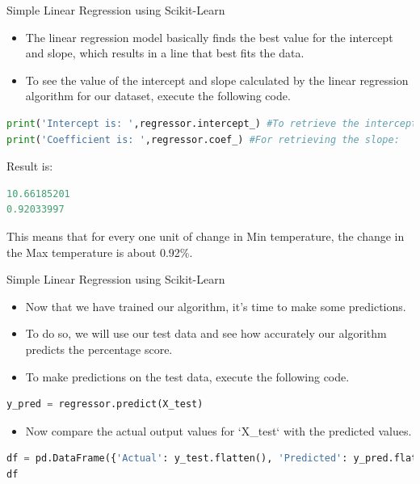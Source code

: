 \documentclass[12pt,xcolor={dvipsnames}]{beamer}
\begin{document}
\begin{frame}[fragile,shrink=12]{Simple Linear Regression using Scikit-Learn}
\begin{itemize}
\item The linear regression model basically finds the best value for the intercept and slope, which results in a line that best fits the data.
\item To see the value of the intercept and slope calculated by the linear regression algorithm for our dataset, execute the following code.
\end{itemize}
\begin{lstlisting}[language=Python]
print('Intercept is: ',regressor.intercept_) #To retrieve the intercept:
print('Coefficient is: ',regressor.coef_) #For retrieving the slope:
\end{lstlisting}
Result is:
\begin{lstlisting}[language=Python]
10.66185201
0.92033997
\end{lstlisting}

\alert{This means that for every one unit of change in Min temperature, the change in the Max temperature is about 0.92\%.}
\end{frame}

\begin{frame}[fragile,shrink=5]{Simple Linear Regression using Scikit-Learn}
\begin{itemize}
\item Now that we have trained our algorithm, it’s time to make some predictions.
\item To do so, we will use our test data and see how accurately our algorithm predicts the percentage score.
\item To make predictions on the test data, execute the following code.
\end{itemize}
\begin{lstlisting}[language=Python]
y_pred = regressor.predict(X_test)
\end{lstlisting}
\begin{itemize}
\item Now compare the actual output values for `X\_test` with the predicted values.
\end{itemize}
\begin{lstlisting}[language=Python]
df = pd.DataFrame({'Actual': y_test.flatten(), 'Predicted': y_pred.flatten()})
df
\end{lstlisting}
\end{frame}
\end{document}
